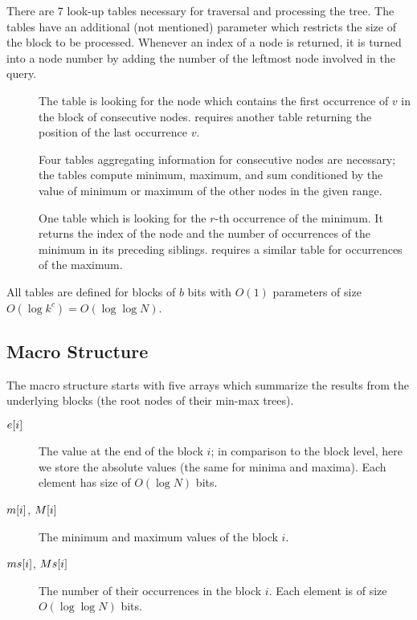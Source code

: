 There are 7 look-up tables necessary for traversal and processing the tree.
The tables have an additional (not mentioned) parameter which restricts the size of the block to be processed.
Whenever an index of a node is returned, it is turned into a node number by adding the number of the leftmost node involved in the query.
\begin{description}
	\item[\fwdSearch]
	The table is looking for the node which contains the first occurrence of $v$ in the block of consecutive nodes.
	\bwdSearch{} requires another table returning the position of the last occurrence $v$.
	
	\item[\rmqInfo]
	Four tables aggregating information for consecutive nodes are necessary; the tables compute minimum, maximum, and sum conditioned by the value of minimum or maximum of the other nodes in the given range.
	
	\item[\rmqSelect]
	One table which is looking for the $r$-th occurrence of the minimum.
	It returns the index of the node and the number of occurrences of the minimum in its preceding siblings.
	\RMQSelect{} requires a similar table for occurrences of the maximum.
\end{description}
All tables are defined for blocks of $b$ bits with $O(1)$ parameters of size $O(\log k^c) = O(\log \log N)$.

\subsection{Macro Structure}

The macro structure starts with five arrays which summarize the results from the underlying blocks (the root nodes of their min-max trees).
\begin{description}
	\item[$e[i\char93$]
	The value at the end of the block $i$; in comparison to the block level, here we store the absolute values (the same for minima and maxima).
	Each element has size of $O(\log N)$ bits.
	
	\item[$m[i\char93$, $M[i\char93$]
	The minimum and maximum values of the block $i$.
	
	\item[$ms[i\char93$, $Ms[i\char93$]
	The number of their occurrences in the block $i$.
	Each element is of size $O(\log \log N)$ bits.
\end{description}

